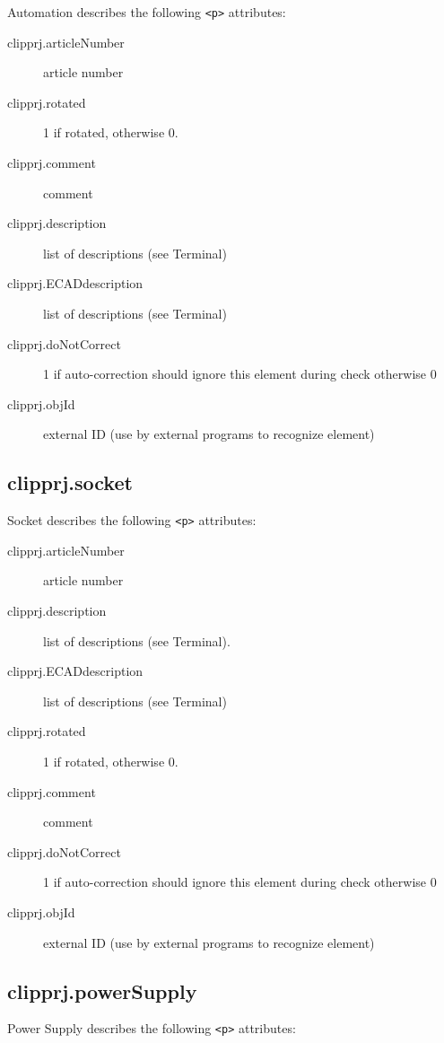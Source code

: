 \documentclass[%
	a4paper,
	oneside,
	listof=numbered,
	parskip=half,
	headsepline=true,
	footsepline=true,
	]{scrbook}
\begin{document}
Automation describes the following \verb|<p>| attributes: 

\begin{description}
	\item[clipprj.articleNumber] article number 
	\item[clipprj.rotated] 1 if rotated, otherwise 0. 
	\item[clipprj.comment] comment 
	\item[clipprj.description] list of descriptions (see Terminal) 
	\item[clipprj.ECADdescription] list of descriptions (see Terminal) 
	\item[clipprj.doNotCorrect] 1 if auto-correction should ignore this element during check otherwise 0 
	\item[clipprj.objId] external ID (use by external programs to recognize element)
\end{description}

\subsection{clipprj.socket}
 
Socket describes the following \verb|<p>| attributes: 

\begin{description}
	\item[clipprj.articleNumber] article number 
	\item[clipprj.description] list of descriptions (see Terminal). 
	\item[ clipprj.ECADdescription] list of descriptions (see Terminal) 
	\item[clipprj.rotated] 1 if rotated, otherwise 0. 
	\item[clipprj.comment] comment 
	\item[clipprj.doNotCorrect] 1 if auto-correction should ignore this element during check otherwise 0 
	\item[clipprj.objId] external ID (use by external programs to recognize element) 
\end{description}

\subsection{clipprj.powerSupply}
 
Power Supply describes the following \verb|<p>| attributes: 
\end{document}
